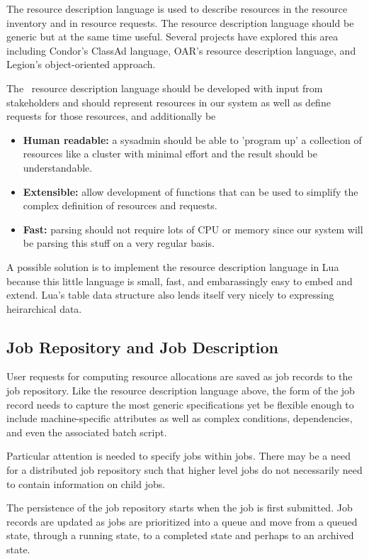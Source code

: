The resource description language is used to describe resources
in the resource inventory and in resource requests.
The resource description language should be generic but at the same
time useful.  Several projects have explored this area including
Condor's ClassAd language\cite{ClassAd},
OAR's resource description language\cite{Oar},
and Legion's\cite{LegionGrid}\cite{LegionRM} object-oriented approach.

The \ngrm\ resource description language should be developed with
input from stakeholders and should represent resources in our system as
well as define requests for those resources, and additionally be
\begin{itemize}
\item{\textbf{Human readable:} a sysadmin should be able to 'program up'
a collection of resources like a cluster with minimal
effort and the result should be understandable.}
\item{\textbf{Extensible:} allow development of functions that can be used
to simplify the complex definition of resources and requests.}
\item{\textbf{Fast:} parsing should not require lots of CPU or memory since
our system will be parsing this stuff on a very regular basis.}
\end{itemize}

A possible solution is to implement the
resource description language in Lua\cite{Lua} because this
little language is small, fast, and embarassingly easy to embed and
extend.  Lua's table data structure also lends itself very nicely to
expressing heirarchical data.

\subsection{Job Repository and Job Description}

User requests for computing resource allocations are saved as job
records to the job repository.  Like the resource description language
above, the form of the job record needs to capture the most generic
specifications yet be flexible enough to include machine-specific
attributes as well as complex conditions, dependencies, and even the
associated batch script.

Particular attention is needed to specify jobs within jobs.  There may
be a need for a distributed job repository such that higher level jobs
do not necessarily need to contain information on child jobs.

The persistence of the job repository starts when the job is first
submitted.  Job records are updated as jobs are prioritized into a
queue and move from a queued state, through a running state, to a
completed state and perhaps to an archived state.

